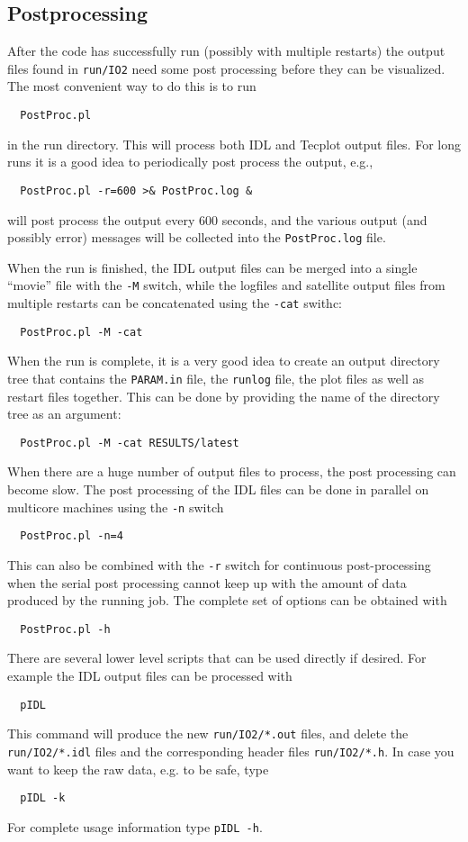 \subsection{Postprocessing}

After the code has successfully run (possibly with multiple restarts) 
the output files found in {\tt run/IO2} need some post processing before 
they can be visualized. The most convenient way to do this is to run
\begin{verbatim}
  PostProc.pl
\end{verbatim}
in the run directory. This will process both IDL and Tecplot output files.
For long runs it is a good idea to periodically post process the output, e.g.,
\begin{verbatim}
  PostProc.pl -r=600 >& PostProc.log &
\end{verbatim}
will post process the output every 600 seconds, and the various
output (and possibly error) messages will be collected into 
the {\tt PostProc.log} file. 

When the run is finished, the IDL output files can be merged into 
a single ``movie'' file with the {\tt -M} switch, 
while the logfiles and satellite output files from multiple restarts 
can be concatenated using the {\tt -cat} swithc:
\begin{verbatim}
  PostProc.pl -M -cat
\end{verbatim}
When the run is complete, it is a very good idea to create an output directory tree
that contains the {\tt PARAM.in} file, the {\tt runlog} file, the plot files as well
as restart files together. This can be done by providing the name of the directory
tree as an argument:
\begin{verbatim}
  PostProc.pl -M -cat RESULTS/latest
\end{verbatim}
When there are a huge number of output files to process, 
the post processing can become slow. The post processing
of the IDL files can be done in parallel on multicore
machines using the {\tt -n} switch
\begin{verbatim}
  PostProc.pl -n=4
\end{verbatim}
This can also be combined with the {\tt -r} switch for continuous 
post-processing when the serial post processing cannot keep up with
the amount of data produced by the running job. The complete set
of options can be obtained with
\begin{verbatim}
  PostProc.pl -h
\end{verbatim}
There are several lower level scripts that can be used directly if desired. 
For example the IDL output files can be processed with
\begin{verbatim}
  pIDL
\end{verbatim}
This command will produce the new {\tt run/IO2/*.out}
files, and delete the {\tt run/IO2/*.idl} files
and the corresponding header files {\tt run/IO2/*.h}.
In case you want to keep the raw data, e.g. to be safe, type
\begin{verbatim}
  pIDL -k
\end{verbatim}
For complete usage information type {\tt pIDL -h}.

